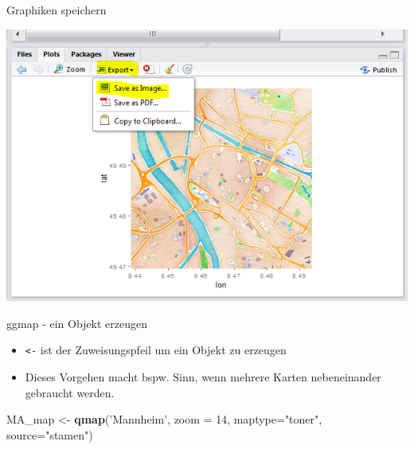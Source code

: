 \documentclass[ignorenonframetext,]{beamer}
\newenvironment{Shaded}{\begin{snugshade}}{\end{snugshade}}
\newcommand{\KeywordTok}[1]{\textcolor[rgb]{0.13,0.29,0.53}{\textbf{#1}}}
\newcommand{\DataTypeTok}[1]{\textcolor[rgb]{0.13,0.29,0.53}{#1}}
\newcommand{\DecValTok}[1]{\textcolor[rgb]{0.00,0.00,0.81}{#1}}
\newcommand{\StringTok}[1]{\textcolor[rgb]{0.31,0.60,0.02}{#1}}
\newcommand{\NormalTok}[1]{#1}
\providecommand{\tightlist}{%
  \setlength{\itemsep}{0pt}\setlength{\parskip}{0pt}}
\begin{document}
\begin{frame}{Graphiken speichern}

\includegraphics{figure/RstudioExport.PNG}

\end{frame}

\begin{frame}[fragile]{ggmap - ein Objekt erzeugen}

\begin{itemize}
\tightlist
\item
  \texttt{\textless{}-} ist der Zuweisungspfeil um ein Objekt zu
  erzeugen
\item
  Dieses Vorgehen macht bspw. Sinn, wenn mehrere Karten nebeneinander
  gebraucht werden.
\end{itemize}

\begin{Shaded}
\begin{Highlighting}[]
\NormalTok{MA_map <-}\StringTok{ }\KeywordTok{qmap}\NormalTok{(}\StringTok{'Mannheim'}\NormalTok{, }
               \DataTypeTok{zoom =} \DecValTok{14}\NormalTok{,}
               \DataTypeTok{maptype=}\StringTok{"toner"}\NormalTok{,}
               \DataTypeTok{source=}\StringTok{"stamen"}\NormalTok{)}
\end{Highlighting}
\end{Shaded}

\end{frame}
\end{document}
